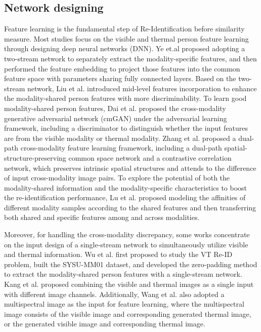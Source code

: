 \documentclass[journal]{IEEEtran}
\begin{document}
\subsection{Network designing}
Feature learning is the fundamental step of Re-Identification before similarity measure. Most studies focus on the visible and thermal person feature learning through designing deep neural networks (DNN).
Ye et.al \cite{ye2018hierarchical,ye2018visible,tifs19vtreid} proposed adopting a two-stream network to separately extract the modality-specific features, and then performed the feature embedding to project those features into the common feature space with parameters sharing fully connected layers.
Based on the two-stream network, Liu et al. \cite{liu2020enhancing} introduced mid-level features incorporation to enhance the modality-shared person features with more discriminability.
To learn good modality-shared person features, Dai et al. \cite{dai2018cross} proposed the cross-modality generative adversarial network (cmGAN) under the adversarial learning framework, including a discriminator to distinguish whether the input features are from the visible modality or thermal modality.
Zhang et al. \cite{zhang2019attend} proposed a dual-path cross-modality feature learning framework, including a dual-path spatial-structure-preserving common space network and a contrastive correlation network, which preserves intrinsic spatial structures and attends to the difference of input cross-modality image pairs.
To explore the potential of both the modality-shared information and the modality-specific characteristics to boost the re-identification performance, Lu et al. \cite{lu2020cross} proposed modeling the affinities of different modality samples according to the shared features and then transferring both shared and specific features among and across modalities.

Moreover, for handling the cross-modality discrepancy, some works concentrate on the input design of a single-stream network to simultaneously utilize visible and thermal information.
Wu et al. \cite{wu2017rgb} first proposed to study the VT Re-ID problem, built the SYSU-MM01 dataset, and developed the zero-padding method to extract the modality-shared person features with a single-stream network.
Kang et al. \cite{kang2019person} proposed combining the visible and thermal images as a single input with different image channels.
Additionally, Wang et al. \cite{wang2019learning1} also adopted a multispectral image as the input for feature learning, where the multispectral image consists of the visible image and corresponding generated thermal image, or the generated visible image and corresponding thermal image.
\end{document}
